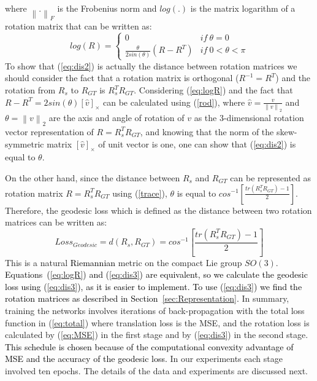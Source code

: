 \documentclass[journal,transmag]{IEEEtran}
\begin{document}
where $\left \| . \right \|_F $ is the Frobenius norm and $log(.)$ is the matrix logarithm of a rotation matrix that can be written as:
\begin{equation}
    log(R) = \left\{\begin{matrix}
0 & if \ \theta=0\\ 
\frac{\theta}{2sin(\theta)} (R-R^T)& if \ 0< \theta<\pi 
\end{matrix}\right. 
    \label{eq:logR}
\end{equation}
To show that (\ref{eq:dis2}) is actually the distance between rotation matrices we should consider the fact that a rotation matrix is orthogonal ($R^{-1}=R^T$) and the rotation from $R_s$ to $R_{GT}$ is $R_s^TR_{GT}$. Considering (\ref{eq:logR}) and the fact that $R-R^T = 2sin(\theta)[\hat{v}]_\times$ can be calculated using (\ref{rod}), where $\hat{v} = \frac{v}{\left \| v \right \|_2}$ and $\theta = {\left \| v \right \|_2}$ are the axis and angle of rotation of $v$ as the 3-dimensional rotation vector representation of $R = R_s^TR_{GT}$, and knowing that the norm of the skew-symmetric matrix $[\hat{v}]_\times$ of unit vector is one, one can show that (\ref{eq:dis2}) is equal to $\theta$.

On the other hand, since the distance between $R_s$ and $R_{GT}$ can be represented as rotation matrix $R=R_s^TR_{GT}$ using (\ref{trace}), $\theta$ is equal to $cos^{-1}\left [ \frac{tr(R_s^TR_{GT})-1}{2} \right ]$. Therefore, the geodesic loss which is defined as the distance between two rotation matrices can be written as:
\begin{equation}
    Loss_{Geodesic} = d(R_s, R_{GT}) = cos^{-1}\left [ \frac{tr(R_s^TR_{GT})-1}{2} \right ]
    \label{eq:dis3}
\end{equation}
This is a natural \textcolor{black}{Riemannian} metric on the compact Lie group $SO(3)$. \textcolor{black}{Equations~(\ref{eq:logR}) and (\ref{eq:dis3}) are equivalent, so we calculate the geodesic loss using (\ref{eq:dis3}), as it is easier to implement. To use (\ref{eq:dis3}) we find the rotation matrices as described in Section~\ref{sec:Representation}.} In summary, training the networks involves iterations of back-propagation with the total loss function in (\ref{eq:total}) where translation loss is the MSE, and the rotation loss is calculated by (\ref{eq:MSE}) in the first stage and by (\ref{eq:dis3}) in the second stage. \textcolor{black}{This schedule is chosen because of the computational convexity advantage of MSE and the accuracy of the geodesic loss.} In our experiments each stage involved ten epochs. The details of the data and experiments are discussed next.
\end{document}
